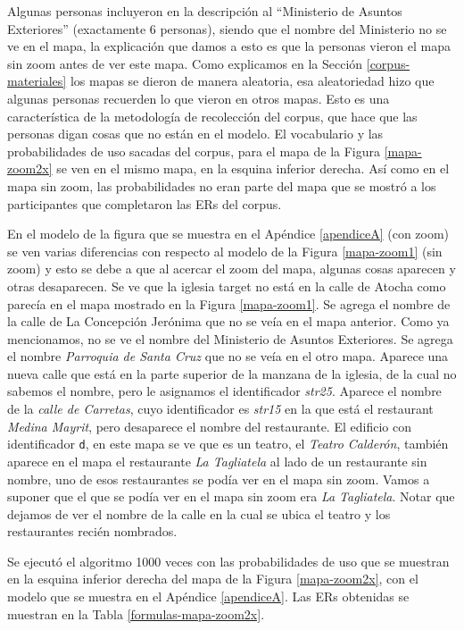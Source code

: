Algunas personas incluyeron en la descripci\'on al ``Ministerio de Asuntos Exteriores'' (exactamente 6 personas), siendo que el nombre del Ministerio no se ve en el mapa, la explicaci\'on que damos a esto es que la personas vieron el mapa sin zoom antes de ver este mapa. Como explicamos en la Secci\'on \ref{corpus-materiales} los mapas se dieron de manera aleatoria, esa aleatoriedad hizo que algunas personas recuerden lo que vieron en otros mapas. Esto es una caracter\'istica de la metodolog\'ia de recolecci\'on del corpus, que hace que las personas digan cosas que no est\'an en el modelo. 
El vocabulario y las probabilidades de uso sacadas del corpus, para el mapa de la Figura \ref{mapa-zoom2x} se ven en el mismo mapa, en la esquina inferior derecha. As\'i como en el mapa sin zoom, las probabilidades no eran parte del mapa que se mostr\'o a los participantes que completaron las ERs del corpus.

En el modelo de la figura que se muestra en el Ap\'endice \ref{apendiceA} (con zoom) se ven varias diferencias con respecto al modelo de la Figura \ref{mapa-zoom1} 
(sin zoom) y esto se debe a que al acercar el zoom del mapa, algunas cosas aparecen y otras desaparecen. Se ve que la iglesia target no est\'a
 en la calle de Atocha como parec\'ia en el mapa mostrado en la Figura \ref{mapa-zoom1}. Se agrega el nombre de la calle de La Concepci\'on 
Jer\'onima que no se ve\'ia en el mapa anterior. Como ya mencionamos, no se ve el nombre del Ministerio de Asuntos Exteriores. Se agrega el nombre {\it Parroquia de Santa Cruz} que no se ve\'ia en el otro mapa. Aparece una nueva calle que est\'a en la parte superior de la manzana de la iglesia, 
de la cual no sabemos el nombre, pero le asignamos el identificador {\it str25}. Aparece el nombre de la {\it calle de Carretas}, 
cuyo identificador
 es {\it str15} en la que est\'a el restaurant {\it Medina Mayrit}, pero desaparece el nombre del restaurante. 
El edificio con identificador {\texttt d}, en este mapa se ve que es un teatro, el {\it Teatro Calder\'on}, tambi\'en aparece en el mapa el restaurante {\it La Tagliatela} al lado
 de un restaurante sin nombre, uno de esos restaurantes se pod\'ia ver en el mapa sin zoom. Vamos a suponer que el que se pod\'ia ver en el mapa sin zoom era {\it La Tagliatela}. Notar que dejamos de ver el nombre de la calle 
en la cual se ubica el teatro y los restaurantes reci\'en nombrados.

Se ejecut\'o el algoritmo 1000 veces con las probabilidades de uso que se muestran en la esquina inferior derecha del mapa de la Figura \ref{mapa-zoom2x}, con el modelo que se muestra en el Ap\'endice \ref{apendiceA}. Las ERs obtenidas se muestran en la Tabla \ref{formulas-mapa-zoom2x}.

